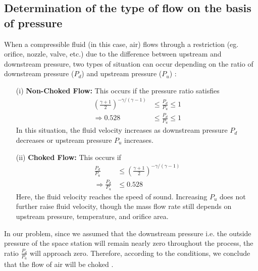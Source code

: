 \documentclass[a4paper, 14pt]{extarticle}
\begin{document}
\subsection{Determination of the type of flow on the basis of pressure}
When a compressible fluid (in this case, air) flows through a restriction (eg. orifice, nozzle, valve, etc.) due to the difference between upstream and downstream pressure, two types of situation can occur depending on the ratio of downstream pressure ($P_d$) and upstream pressure ($P_u$) :
\begin{itemize}
    \item [(i)] \textbf{Non-Choked Flow:} This occurs if the pressure ratio satisfies
    \begin{align*}
        \left(\frac{\gamma+1}{2}\right)^{-\gamma/(\gamma-1)} &\leq \frac{P_d}{P_u} \leq 1 \\
        \Rightarrow 0.528 &\leq \frac{P_d}{P_u} \leq 1
    \end{align*}
    In this situation, the fluid velocity increases as downstream pressure \(P_d\) decreases or upstream pressure \(P_u\) increases.
    
    \item [(ii)] \textbf{Choked Flow:} This occurs if 
    \begin{align*}
        \frac{P_d}{P_u} &\leq \left(\frac{\gamma+1}{2}\right)^{-\gamma/(\gamma-1)} \\
        \Rightarrow \frac{P_d}{P_u} &\leq 0.528
    \end{align*}
    Here, the fluid velocity reaches the speed of sound. Increasing \(P_u\) does not further raise fluid velocity, though the mass flow rate still depends on upstream pressure, temperature, and orifice area.
\end{itemize} 
In our problem, since we assumed that the downstream pressure i.e. the outside pressure of the space station will remain nearly zero throughout the process, the ratio $\frac{P_d}{P_u}$ will approach zero. Therefore, according to the conditions, we conclude that the flow of air will be choked \citep{anderson}.
\end{document}

